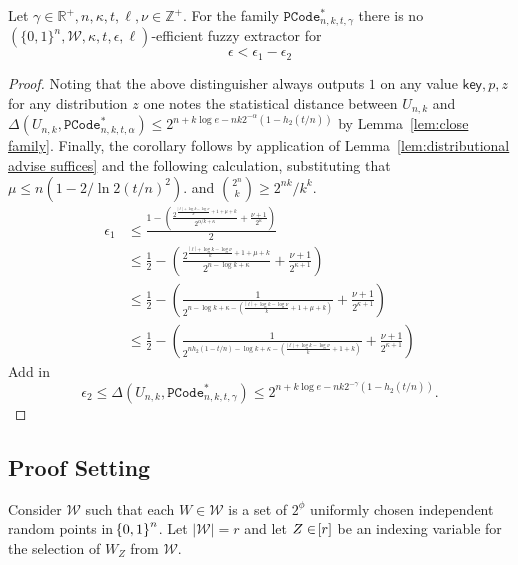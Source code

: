 \begin{corollary}
Let $\gamma \in\mathbb{R}^+, n, \kappa, t, \ell, \nu \in\mathbb{Z}^+$.
For the  family $ \mathtt{PCode}_{n, k, t, \gamma}^{*}$ there is no $(\{0,1\}^n, \mathcal{W}, \kappa, t, \epsilon, \ell)$-efficient fuzzy extractor for 
\[
\epsilon< \epsilon_1-\epsilon_2
\]
\end{corollary}
\begin{proof}
Noting that the above distinguisher always outputs $1$ on any value $\mathsf{key}, p, z$ for any distribution $z$ one notes the statistical distance between $U_{n,k}$ and  $\Delta(U_{n,k}, \mathtt{PCode}_{n, k, t, \alpha}^{*}) \le 2^{n+k\log e- nk2^{-\alpha}(1-h_2(t/n))}$ by Lemma~\ref{lem:close family}.  Finally, the corollary follows by application of Lemma~\ref{lem:distributional advise suffices} and the following calculation, substituting that $\mu\le n(1-2/\ln 2 (t/n)^2).$ and ${2^n\choose k} \ge 2^{nk} /k^k$.
\begin{align*}
\epsilon_1 &\le \frac{1-\left(\frac{2^{\frac{|\ell|+\log{k}-\log{\nu}}{k}+1+\mu+k}}{{2^{\alpha/k+\kappa}}}+\frac{\nu+1}{2^\kappa}\right)}{2}\\
 &\le \frac{1}{2}-\left(\frac{2^{\frac{|\ell|+\log{k}-\log{\nu}}{k}+1+\mu+k}}{{2^{n-\log k+\kappa}}}+\frac{\nu+1}{2^{\kappa+1}}\right)\\
  &\le \frac{1}{2}-\left(\frac{1}{{2^{n-\log k+\kappa-(\frac{|\ell|+\log{k}-\log{\nu}}{k}+1+\mu+k)}}}+\frac{\nu+1}{2^{\kappa+1}}\right)\\
    &\le \frac{1}{2}-\left(\frac{1}{{2^{nh_2(1-t/n)-\log k+\kappa-(\frac{|\ell|+\log{k}-\log{\nu}}{k}+1+k)}}}+\frac{\nu+1}{2^{\kappa+1}}\right)
 \end{align*}
   Add in \[\epsilon_2\le \Delta(U_{n,k}, \mathtt{PCode}_{n, k, t, \gamma}^{*}) \le 2^{n+k\log e- nk2^{-\gamma}(1-h_2(t/n))}.\]

\end{proof} 


\subsection{Proof Setting}
Consider $\mathcal{W}$ such that each $W \in \mathcal{W}$ is a set of $2^{\phi}$ uniformly chosen independent random points in $\!\left\{ 0,1 \right\}^{n}$. 
Let $|\mathcal{W}| = r$ and let $Z \in \!\left[r\right]$ be an indexing variable for the selection of $W_Z$ from $\mathcal{W}$. 

